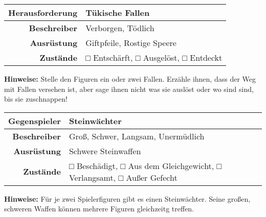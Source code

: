 \documentclass[]{article}
\begin{document}
\begin{longtable}[]{@{}rl@{}}
\toprule
Herausforderung & Tükische Fallen\tabularnewline
\midrule
\endhead
\textbf{Beschreiber} & Verborgen, Tödlich\tabularnewline
\textbf{Ausrüstung} & Giftpfeile, Rostige Speere\tabularnewline
\textbf{Zustände} & □ Entschärft, □ Ausgelöst, □ Entdeckt\tabularnewline
\bottomrule
\end{longtable}

\textbf{Hinweise:} Stelle den Figuren ein oder zwei Fallen. Erzähle
ihnen, dass der Weg mit Fallen versehen ist, aber sage ihnen nicht was
sie auslöst oder wo sind sind, bis sie zuschnappen!

\begin{longtable}[]{@{}rl@{}}
\toprule
\begin{minipage}[b]{0.19\columnwidth}\raggedleft\strut
Gegenspieler
\strut\end{minipage} &
\begin{minipage}[b]{0.75\columnwidth}\raggedright\strut
Steinwächter
\strut\end{minipage}\tabularnewline
\midrule
\endhead
\begin{minipage}[t]{0.19\columnwidth}\raggedleft\strut
\textbf{Beschreiber}
\strut\end{minipage} &
\begin{minipage}[t]{0.75\columnwidth}\raggedright\strut
Groß, Schwer, Langsam, Unermüdlich
\strut\end{minipage}\tabularnewline
\begin{minipage}[t]{0.19\columnwidth}\raggedleft\strut
\textbf{Ausrüstung}
\strut\end{minipage} &
\begin{minipage}[t]{0.75\columnwidth}\raggedright\strut
Schwere Steinwaffen
\strut\end{minipage}\tabularnewline
\begin{minipage}[t]{0.19\columnwidth}\raggedleft\strut
\textbf{Zustände}
\strut\end{minipage} &
\begin{minipage}[t]{0.75\columnwidth}\raggedright\strut
□ Beschädigt, □ Aus dem Gleichgewicht, □ Verlangsamt, □ Außer Gefecht
\strut\end{minipage}\tabularnewline
\bottomrule
\end{longtable}

\textbf{Hinweise:} Für je zwei Spielerfiguren gibt es einen
Steinwächter. Seine großen, schweren Waffen können mehrere Figuren
gleichzeitg treffen.
\end{document}
